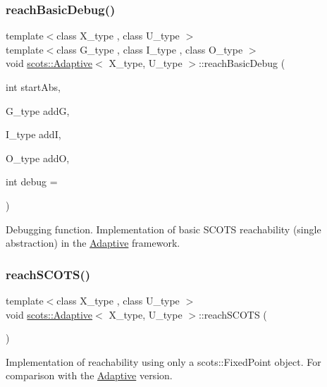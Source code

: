 \subsubsection{\texorpdfstring{reach\+Basic\+Debug()}{reachBasicDebug()}}
{\footnotesize\ttfamily template$<$class X\+\_\+type , class U\+\_\+type $>$ \\
template$<$class G\+\_\+type , class I\+\_\+type , class O\+\_\+type $>$ \\
void \hyperlink{classscots_1_1Adaptive}{scots\+::\+Adaptive}$<$ X\+\_\+type, U\+\_\+type $>$\+::reach\+Basic\+Debug (\begin{DoxyParamCaption}\item[{int}]{start\+Abs,  }\item[{G\+\_\+type}]{addG,  }\item[{I\+\_\+type}]{addI,  }\item[{O\+\_\+type}]{addO,  }\item[{int}]{debug = {} }\end{DoxyParamCaption})\hspace{0.3cm}{\ttfamily [inline]}}

Debugging function. Implementation of basic S\+C\+O\+TS reachability (single abstraction) in the \hyperlink{classscots_1_1Adaptive}{Adaptive} framework. \mbox{\label{classscots_1_1Adaptive_ad583956ec022b6bd00a62680ff38103a}} 
\subsubsection{\texorpdfstring{reach\+S\+C\+O\+T\+S()}{reachSCOTS()}}
{\footnotesize\ttfamily template$<$class X\+\_\+type , class U\+\_\+type $>$ \\
void \hyperlink{classscots_1_1Adaptive}{scots\+::\+Adaptive}$<$ X\+\_\+type, U\+\_\+type $>$\+::reach\+S\+C\+O\+TS (\begin{DoxyParamCaption}{ }\end{DoxyParamCaption})\hspace{0.3cm}{\ttfamily [inline]}}

Implementation of reachability using only a scots\+::\+Fixed\+Point object. For comparison with the \hyperlink{classscots_1_1Adaptive}{Adaptive} version. \mbox{\label{classscots_1_1Adaptive_a76d026d45bd794eba3ef69c18835dd54}} 
